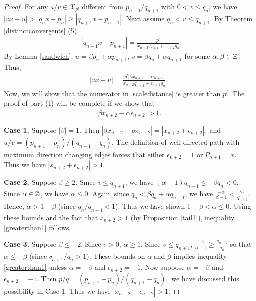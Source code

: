 \documentclass[12pt]{elsarticle}
\theoremstyle{definition}
\newcommand{\mX}{{\mathcal X}}
\newcommand{\ep}{\epsilon}
\renewcommand{\a}{\alpha}                      \renewcommand{\b}{\beta}
\begin{document}
{\begin{proof}
  			
  			For any $u/v\in\mX_{p^l}$ different from $p_{n+1}/q_{n+1}$ with $0<v\le q_{n}$, we have $|vx-u|>|q_{n}x-p_{n}|\ge|q_{n+1}x-p_{n+1}|$. Next assume $q_{n}< v\le q_{n+1}$. By Theorem \ref{distinctconvergents} (5),
  			\begin{align*}
			&|q_{n+1}x-p_{n+1}| =\frac{p^l}{x_{n+2}q_{n+1}+\epsilon_{n+2}q_{n}}. 
  			\end{align*}
  		By Lemma \ref{sandwich},
  			$u= \beta p_{n}+\alpha p_{n+1}$, $v= \beta q_{n}+\alpha q_{n+1}$ for some $\alpha,\beta\in\mathbb{Z}$. %
  			Thus,
  			\begin{align}|vx-u|=\frac{p^l| \beta x_{n+2}-\alpha \epsilon_{n+2}|}{x_{n+2}q_{n+1}+\ep_{n+2}q_n}.\label{scaledistance}\end{align}
  			Now, we will show that the numerator in \eqref{scaledistance} is greater than $p^l$. 	The proof of part (1) will be complete if we show that
  			\begin{equation}\label{greaterthan1}
  			| \beta x_{n+2}-\alpha \epsilon_{n+2}|>1.
  			\end{equation}
  			
  			\textbf{Case 1.} Suppose $|\beta|=1$. Then
  			$	| \beta x_{n+2}-\alpha \epsilon_{n+2}|=|x_{n+2}+\ep_{n+2}|,$
  			and $u/v=(p_{n+1}-p_n)/(q_{n+1}-q_n).$ The definition of well directed path with maximum direction changing edges forces that either $\ep_{n+2}=1$ or $P_{n+1}=x.$
  			Thus we have $|x_{n+2}+\ep_{n+2}|>1.$
  			
  			
  			\textbf{Case 2.} Suppose $\beta\ge2$. Since $v\le q_{n+1}$, we have
  			$(\alpha-1)q_{n+1}\le -\beta q_{n} <0$. Since $\alpha\in\mathbb{Z}$, we have
  			$\alpha\leq0$. Again, since $q_{n}< \beta q_{n}+\alpha q_{n+1}$, we have
  			$\frac{-\alpha}{\beta-1}< \frac{q_{n}}{q_{n+1}}$.
  			Hence, $\alpha> 1-\beta$ (since $q_{n}/q_{n+1}<1$). Thus we have shown $1-\beta<\alpha\le0$.
  			Using these bounds and the fact that $x_{n+2}> 1$ (by Proposition \ref{tail1}), inequality  \eqref{greaterthan1} follows.
  			
  			\textbf{Case 3.} Suppose $\beta\le -2$. Since $v>0$, $\alpha\geq 1$.
  			Since $v\le q_{n+1}$, $\frac{-\beta}{\alpha-1}\ge \frac{q_{n+1}}{q_{n}}$ so that $\alpha\le -\beta$ (since $q_{n+1}/q_{n}>1$). These bounds on $\alpha$ and $\beta$ implies inequality \eqref{greaterthan1} unless $\a=-\b$ and $\ep_{n+2}=-1$. Now suppose $\a=-\b$ and $\ep_{n+2}=-1$. Then $p/q=(p_{n+1}-p_n)/(q_{n+1}-q_n),$ we have discussed this possibility in Case 1. Thus we have $|x_{n+2}+\ep_{n+2}|>1.$
  		

\end{proof}}
\end{document}
